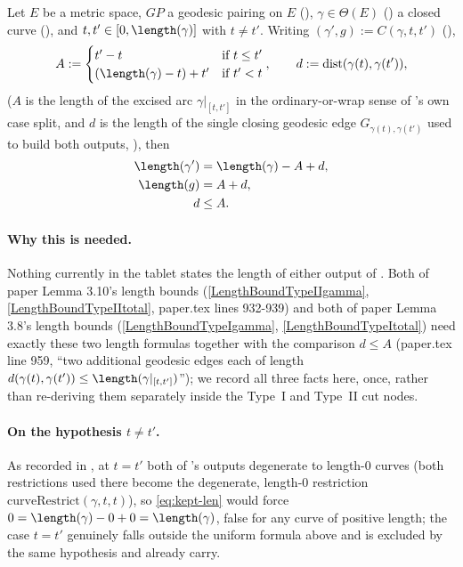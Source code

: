 \begin{lemma}
  Let $E$ be a metric space, $GP$ a geodesic pairing on $E$ (), $\gamma \in
  \Theta(E)$ () a closed curve (), and $t,t' \in
  [0,\length(\gamma)]$ with $t \ne t'$. Writing $(\gamma',g) := C(\gamma,t,t')$
  (),
  \[
    A := \begin{cases} t'-t & \text{if } t \le t' \\ (\length(\gamma)-t)+t' & \text{if } t'<t
    \end{cases}
    , \qquad
    d := \mathrm{dist}(\gamma(t),\gamma(t'))
    ,
  \]
  ($A$ is the length of the excised arc $\gamma|_{[t,t']}$ in the ordinary-or-wrap sense of
  's own case split, and $d$ is the length of the single closing geodesic edge
  $G_{\gamma(t),\gamma(t')}$ used to build both outputs, ), then
  \begin{align}
    \label{eq:kept-len}
    \length(\gamma') &= \length(\gamma) - A + d , \\
    \label{eq:discarded-len}
    \length(g) &= A + d , \\
    \label{eq:closing-le-arc}
    d &\le A .
  \end{align}

  \paragraph{Why this is needed.} Nothing currently in the tablet states the length of either
  output of . Both of paper Lemma 3.10's length bounds
  (\eqref{LengthBoundTypeIIgamma}, \eqref{LengthBoundTypeIItotal}, paper.tex lines 932-939) and both
  of paper Lemma 3.8's length bounds (\eqref{LengthBoundTypeIgamma}, \eqref{LengthBoundTypeItotal})
  need exactly these two length formulas together with the comparison $d \le A$ (paper.tex line
  959, ``two additional geodesic edges each of length $d(\gamma(t),\gamma(t'))\le
  \length(\gamma|_{[t,t']})$''); we record all three facts here, once, rather than re-deriving them
  separately inside the Type~I and Type~II cut nodes.

  \paragraph{On the hypothesis $t \ne t'$.} As recorded in , at $t=t'$ both
  of 's outputs degenerate to length-$0$ curves (both restrictions used there
  become the degenerate, length-$0$ restriction $\mathrm{curveRestrict}(\gamma,t,t)$), so
  \eqref{eq:kept-len} would force $0 = \length(\gamma) - 0 + 0 = \length(\gamma)$, false for any
  curve of positive length; the case $t=t'$ genuinely falls outside the uniform formula above and is
  excluded by the same hypothesis  and  already
  carry.
\end{lemma}

